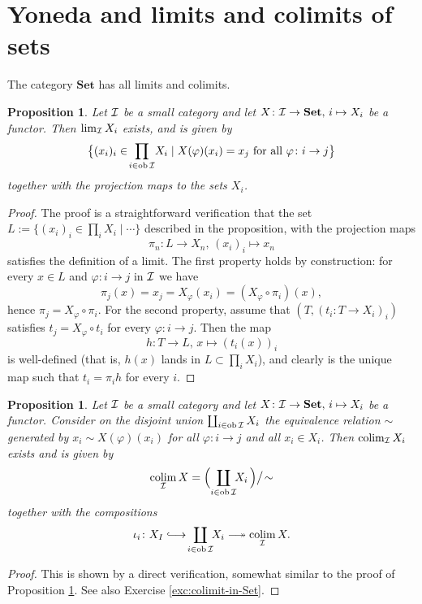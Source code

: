 \documentclass[11pt]{amsbook}
\newcommand{\longsurjto}{\relbar\joinrel\twoheadrightarrow}
\newcommand{\longinjto}{\lhook\joinrel\longrightarrow}
\DeclareMathOperator\ob{ob}
\DeclareMathOperator\colim{colim}
\def\Set{\mathbf{Set}}
\theoremstyle{plain}
\newtheorem{proposition}[theorem]{Proposition}
\theoremstyle{definition}
\begin{document}
\section{Yoneda and limits and colimits of sets}

The category $\Set$ has all limits and colimits.

\begin{proposition}\label{prop:limit-in-Set}
Let ${\mathcal{I}}$ be a small category and let $X\colon \cI \to \Set,\, i \mapsto X_i$ be a functor. Then
$\lim_{\mathcal{I}} X_i$ exists, and is given by
\[
	\big\{ (x_i)_i \in \! \prod_{i\in \ob\cI} \! X_i \mid
	\text{$X(\varphi)(x_i) = x_j$ for all $\varphi\colon i \to j$} \big\}
\]
together with the projection maps to the sets $X_i$.
\end{proposition}

\begin{proof}The proof is a straightforward verification that the set $L:=\{ (x_i)_i \in \! \prod_{i} \! X_i \mid \cdots \}$  described in the proposition, with the projection maps
\[
	\pi_n\colon L\to X_n,\, (x_i)_i \mapsto x_n
\]
satisfies the definition of a limit. The first property holds by construction: for every $x \in L$ and $\varphi\colon i \to j$ in ${\mathcal{I}}$ we have
\[
	\pi_j (x) = x_j = X_\varphi (x_i) = ( X_\varphi \circ \pi_i )(x),
\]
hence $\pi_j = X_\varphi \circ \pi_i$. For the second property, assume that $(T,(t_i\colon T\to X_i)_i)$ satisfies 
$t_j = X_\varphi \circ t_i$ for every $\varphi\colon i\to j$. Then the map 
\[
	h \colon T \to L,\, x \mapsto  (t_i(x))_i 
\]
is well-defined (that is, $h(x)$ lands in $L \subset \prod_i X_i$), and clearly is the unique map such that $t_i = \pi_i h$ for every $i$.
\end{proof}



\begin{proposition}\label{prop:colimit-in-Set}
Let ${\mathcal{I}}$ be a small category and let $X\colon \cI \to \Set,\, i \mapsto X_i$ be a functor. Consider on the disjoint union 
$\coprod_{i\in \ob\cI}  X_i$
the equivalence relation $\sim$ generated by $x_i \sim X(\varphi)(x_i)$ for all $\varphi\colon i \to j$ and all $x_i \in X_i$. Then 
$\colim_{\cI} X_i$ exists and is given by
\[
	\colim_{\cI} X = \Big( \!\coprod_{i\in \ob\cI}\!\!  X_i\, \Big) \big/ \! \sim
\]
together with the compositions
\[
	\iota_i \colon X_I \longinjto \!\coprod_{i\in \ob\cI} \!\! X_i \longsurjto \colim_{\cI} X.
\]
\end{proposition}

\begin{proof}
This is shown by a direct verification, somewhat similar to the proof of Proposition \ref{prop:limit-in-Set}. See also Exercise \ref{exc:colimit-in-Set}.
\end{proof}
\end{document}
